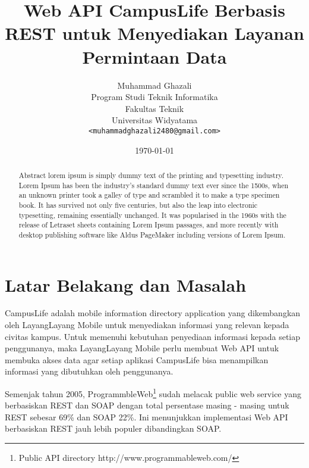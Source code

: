 \documentclass[a4paper, 12pt]{report}
\title{\textbf{Web API CampusLife Berbasis REST untuk Menyediakan Layanan Permintaan Data}}
\author{
Muhammad Ghazali\\
Program Studi Teknik Informatika\\
Fakultas Teknik\\
Universitas Widyatama
\\ \texttt{<muhammadghazali2480@gmail.com>}
}
\date{\today}
\begin{document}
\maketitle

\tableofcontents
\setcounter{tocdepth}{3}

\listoffigures
\listoftables

\begin{abstract}
Abstract lorem ipsum is simply dummy text of the printing and typesetting industry. Lorem Ipsum has been the industry's standard dummy text ever since the 1500s, when an unknown printer took a galley of type and scrambled it to make a type specimen book. It has survived not only five centuries, but also the leap into electronic typesetting, remaining essentially unchanged. It was popularised in the 1960s with the release of Letraset sheets containing Lorem Ipsum passages, and more recently with desktop publishing software like Aldus PageMaker including versions of Lorem Ipsum.
\end{abstract}

\section*{Latar Belakang dan Masalah}
CampusLife adalah mobile information directory application yang dikembangkan oleh LayangLayang Mobile untuk menyediakan informasi yang relevan kepada civitas kampus. Untuk memenuhi kebutuhan penyediaan informasi kepada setiap penggunanya, maka LayangLayang Mobile perlu membuat Web API untuk membuka akses data agar setiap aplikasi CampusLife bisa menampilkan informasi yang dibutuhkan oleh penggunanya.

Semenjak tahun 2005, ProgrammbleWeb\footnote{Public API directory http://www.programmableweb.com/} sudah melacak public web service yang berbasiskan REST dan SOAP dengan total persentase masing - masing untuk REST sebesar 69\% dan SOAP 22\%. Ini menunjukkan implementasi Web API berbasiskan REST jauh lebih populer dibandingkan SOAP.\cite{programmableweb-apis}

\end{document}
